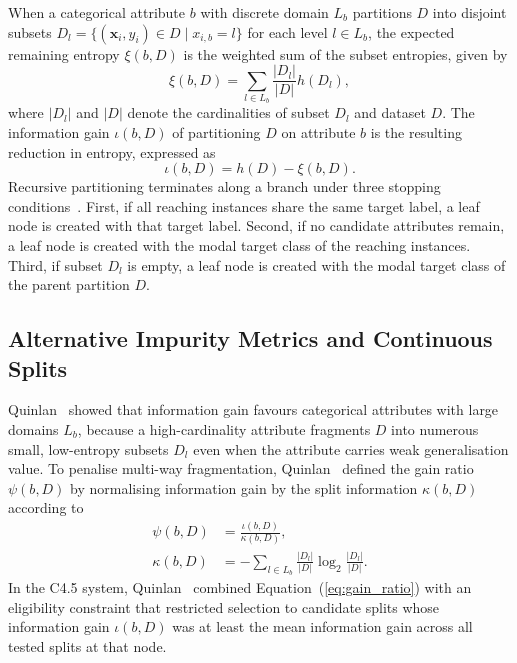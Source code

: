When a categorical attribute $b$ with discrete domain $L_b$ partitions $D$ into disjoint subsets $D_l = \{(\mathbf{x}_i, y_i) \in D \mid x_{i,b} = l\}$ for each level $l \in L_b$, the expected remaining entropy $\xi(b, D)$ is the weighted sum of the subset entropies, given by
\begin{equation}
    \xi(b, D) = \sum_{l \in L_b} \frac{|D_l|}{|D|} h(D_l),
    \label{eq:rem}
\end{equation}
where $|D_l|$ and $|D|$ denote the cardinalities of subset $D_l$ and dataset $D$. The information gain $\iota(b, D)$ of partitioning $D$ on attribute $b$ is the resulting reduction in entropy, expressed as
\begin{equation}
    \iota(b, D) = h(D) - \xi(b, D).
    \label{eq:ig}
\end{equation}
Recursive partitioning terminates along a branch under three stopping conditions~\cite{Kelleher2020}. First, if all reaching instances share the same target label, a leaf node is created with that target label. Second, if no candidate attributes remain, a leaf node is created with the modal target class of the reaching instances. Third, if subset $D_l$ is empty, a leaf node is created with the modal target class of the parent partition $D$.

\subsection{Alternative Impurity Metrics and Continuous Splits}
\label{subsec:bg_metrics}
Quinlan~\cite{Quinlan1986} showed that information gain favours categorical attributes with large domains $L_b$, because a high-cardinality attribute fragments $D$ into numerous small, low-entropy subsets $D_l$ even when the attribute carries weak generalisation value. To penalise multi-way fragmentation, Quinlan~\cite{Quinlan1986,Quinlan1993} defined the gain ratio $\psi(b, D)$ by normalising information gain by the split information $\kappa(b, D)$ according to
\begin{equation}
\begin{aligned}
    \psi(b, D) &= \frac{\iota(b, D)}{\kappa(b, D)}, \\
    \kappa(b, D) &= - \sum_{l \in L_b} \frac{|D_l|}{|D|} \log_2 \frac{|D_l|}{|D|}.
\end{aligned}
\label{eq:gain_ratio}
\end{equation}
In the C4.5 system, Quinlan~\cite{Quinlan1993} combined Equation~(\ref{eq:gain_ratio}) with an eligibility constraint that restricted selection to candidate splits whose information gain $\iota(b, D)$ was at least the mean information gain across all tested splits at that node.

